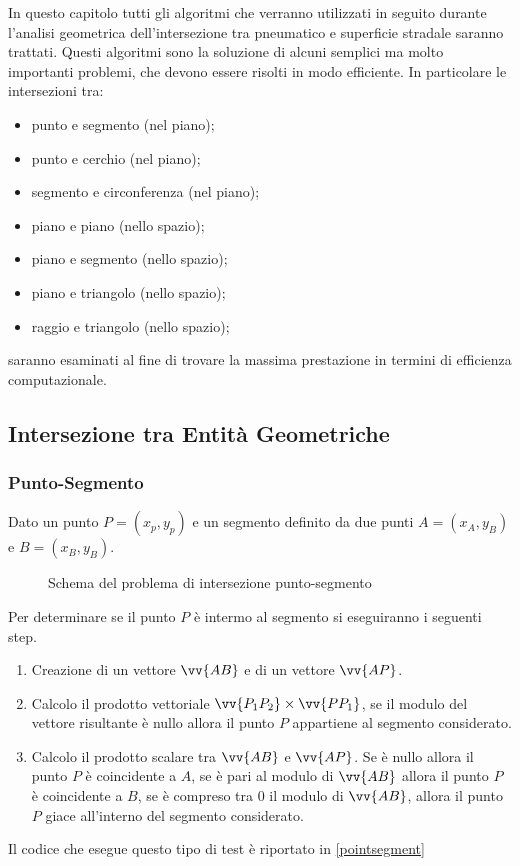 In questo capitolo tutti gli algoritmi che verranno utilizzati in seguito durante l'analisi geometrica dell'intersezione tra pneumatico e superficie stradale saranno trattati. Questi algoritmi sono la soluzione di alcuni semplici ma molto importanti problemi, che devono essere risolti in modo efficiente. In particolare le intersezioni tra:
\begin{itemize}
	\item punto e segmento (nel piano);
	\item punto e cerchio (nel piano);
	\item segmento e circonferenza (nel piano);
	\item piano e piano (nello spazio);
	\item piano e segmento (nello spazio);
	\item piano e triangolo (nello spazio);
	\item raggio e triangolo (nello spazio);
\end{itemize}
saranno esaminati al fine di trovare la massima prestazione in termini di efficienza computazionale.
%
\subsection{Intersezione tra Entità Geometriche}
%
\subsubsection{Punto-Segmento}
Dato un punto $P = (x_p, y_p)$ e un segmento definito da due punti $A = (x_A, y_B)$ e $B = (x_B, y_B)$.

\begin{figure}[h!]
	\centering
	\caption{Schema del problema di intersezione punto-segmento}
\end{figure}
\noindent
Per determinare se il punto $P$ è intermo al segmento si eseguiranno i seguenti step.
\begin{enumerate}
	\item Creazione di un vettore $\vv{AB}$ e di un vettore $\vv{AP}$.
	\item Calcolo il prodotto vettoriale  $\vv{P_1P_2} \times  \vv{PP_1}$, se il modulo del vettore risultante è nullo allora il punto $P$ appartiene al segmento considerato.
	\item Calcolo il prodotto scalare tra $\vv{AB}$ e $\vv{AP}$. Se è nullo allora il punto $P$ è coincidente a $A$, se è pari al modulo di $\vv{AB}$ allora il punto $P$ è coincidente a $B$, se è compreso tra 0 il modulo di $\vv{AB}$, allora il punto $P$ giace all'interno del segmento considerato.
\end{enumerate}
Il codice che esegue questo tipo di test è riportato in \figurename{ \ref{pointsegment}}

